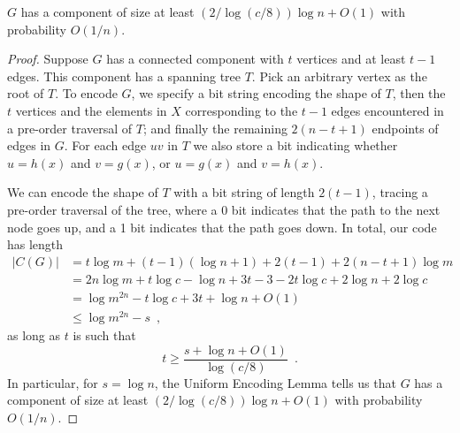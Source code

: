 \documentclass[prodmode,acmcsur]{acmsmall}
\begin{document}
\begin{lem}
  $G$ has a component of size at least $(2/\log(c/8))\log n + O(1)$
  with probability $O(1/n)$.
\end{lem}
\begin{proof}
  Suppose $G$ has a connected component with $t$ vertices and at least
  $t-1$ edges. This component has a spanning tree $T$. Pick an
  arbitrary vertex as the root of $T$. To encode $G$, we specify
  a bit string encoding the shape of $T$, then
  the $t$ vertices and the elements in $X$ corresponding to
  the $t-1$ edges encountered in a pre-order
  traversal of $T$; and
  finally the remaining $2(n - t + 1)$ endpoints of edges in $G$.
  For each edge $uv$ in $T$ we also store a bit
   indicating whether $u = h(x)$ and $v = g(x)$, or $u
  = g(x)$ and $v = h(x)$.

  We can encode the shape of $T$ with a bit string of length
  $2(t - 1)$, tracing a pre-order traversal of the tree, where a 0 bit
  indicates that the path to the next node goes up, and a 1 bit indicates
  that the path goes down. In total, our code has length
  \begin{align*}
    |C(G)| &= t \log m + (t - 1) (\log n + 1) + 2(t - 1) + 2 (n - t + 1) \log m \\
           &= 2n\log m + t \log c - \log n + 3t - 3 - 2t \log c + 2\log n + 2 \log c \tag{since $m = cn$}\\
           &= \log m^{2n} - t \log c + 3t + \log n + O(1) \\
           &\le \log m^{2n} - s \enspace ,
  \end{align*}
  as long as $t$ is such that
  \[
    t \geq \frac{s + \log n + O(1)}{\log (c/8)} \enspace .
  \]
  In particular, for $s = \log n$, the Uniform
  Encoding Lemma tells us that $G$ has a component of size at least
  $(2/\log (c/8))\log n + O(1)$ with probability $O(1/n)$.
\end{proof}
\end{document}
